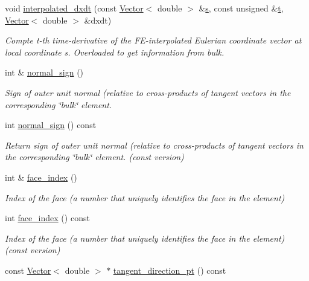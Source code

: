 \begin{DoxyCompactItemize}
void \hyperlink{classoomph_1_1FaceElement_ae8741b05add40d08bb324c8e44effa11}{interpolated\+\_\+dxdt} (const \hyperlink{classoomph_1_1Vector}{Vector}$<$ double $>$ \&\hyperlink{cfortran_8h_ab7123126e4885ef647dd9c6e3807a21c}{s}, const unsigned \&\hyperlink{cfortran_8h_af6f0bd3dc13317f895c91323c25c2b8f}{t}, \hyperlink{classoomph_1_1Vector}{Vector}$<$ double $>$ \&dxdt)
\begin{DoxyCompactList}\small\item\em Compte t-\/th time-\/derivative of the F\+E-\/interpolated Eulerian coordinate vector at local coordinate s. Overloaded to get information from bulk. \end{DoxyCompactList}\item 
int \& \hyperlink{classoomph_1_1FaceElement_add995e91979ad663e21cc2b63dd710d9}{normal\+\_\+sign} ()
\begin{DoxyCompactList}\small\item\em Sign of outer unit normal (relative to cross-\/products of tangent vectors in the corresponding \char`\"{}bulk\char`\"{} element. \end{DoxyCompactList}\item 
int \hyperlink{classoomph_1_1FaceElement_a7a3b1effe068221ac39c14a9ed71d34d}{normal\+\_\+sign} () const
\begin{DoxyCompactList}\small\item\em Return sign of outer unit normal (relative to cross-\/products of tangent vectors in the corresponding \char`\"{}bulk\char`\"{} element. (const version) \end{DoxyCompactList}\item 
int \& \hyperlink{classoomph_1_1FaceElement_a478d577ac6db67ecc80f1f02ae3ab170}{face\+\_\+index} ()
\begin{DoxyCompactList}\small\item\em Index of the face (a number that uniquely identifies the face in the element) \end{DoxyCompactList}\item 
int \hyperlink{classoomph_1_1FaceElement_a387bc31caaf8c6a8c2f8b287823bfd85}{face\+\_\+index} () const
\begin{DoxyCompactList}\small\item\em Index of the face (a number that uniquely identifies the face in the element) (const version) \end{DoxyCompactList}\item 
const \hyperlink{classoomph_1_1Vector}{Vector}$<$ double $>$ $\ast$ \hyperlink{classoomph_1_1FaceElement_a361f92bae4d926903947e2e0d7672f3c}{tangent\+\_\+direction\+\_\+pt} () const

\end{DoxyCompactItemize}
